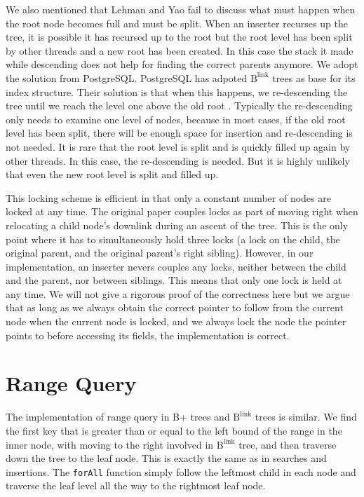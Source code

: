 \documentclass[11pt]{report}
\theoremstyle{definition}
\begin{document}
We also mentioned that Lehman and Yao fail to discuss what must happen when the root node becomes full and must be split. When an inserter recurses up the tree, it is possible it has recursed up to the root but the root level has been split by other threads and a new root has been created. In this case the stack it made while descending does not help for finding the correct parents anymore. We adopt the solution from PostgreSQL. PostgreSQL has adpoted $\text{B}^{\text{link}}$ trees as base for its index structure. Their solution is that when this happens, we re-descending the tree until we reach the level one above the old root \cite{postgres_readme}. Typically the re-descending only needs to examine one level of nodes, because in most cases, if the old root level has been split, there will be enough space for insertion and re-descending is not needed. It is rare that the root level is split and is quickly filled up again by other threads. In this case, the re-descending is needed. But it is highly unlikely that even the new root level is split and filled up.

This locking scheme is efficient in that only a constant number of nodes are locked at any time. The original paper couples locks as part of moving right when relocating a child node's downlink during an ascent of the tree.  This is the only point where it has to simultaneously hold three locks (a lock on the child, the original parent, and the original parent's right sibling). However, in our implementation, an inserter nevers couples any locks, neither between the child and the parent, nor between siblings. This means that only one lock is held at any time. We will not give a rigorous proof of the correctness here but we argue that as long as we always obtain the correct pointer to follow from the current node when the current node is locked, and we always lock the node the pointer points to before accessing its fields, the implementation is correct.

\section{Range Query}
\label{sec:range-query}

The implementation of range query in B+ trees and $\text{B}^{\text{link}}$ trees is similar. We find the first key that is greater than or equal to the left bound of the range in the inner node, with moving to the right involved in $\text{B}^{\text{link}}$ tree, and then traverse down the tree to the leaf node. This is exactly the same as in searches and insertions. The \texttt{forAll} function simply follow the leftmost child in each node and traverse the leaf level all the way to the rightmost leaf node.
\end{document}
